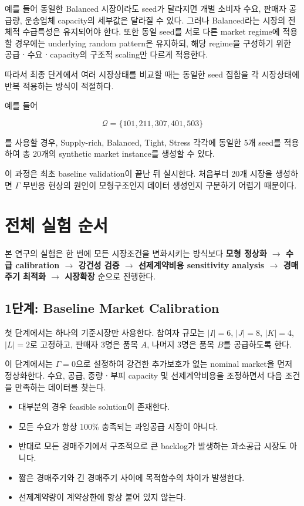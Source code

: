 \documentclass[11pt,a4paper]{article}
\begin{document}
예를 들어 동일한 Balanced 시장이라도 seed가 달라지면
개별 소비자 수요, 판매자 공급량, 운송업체 capacity의 세부값은 달라질 수 있다.
그러나 Balanced라는 시장의 전체적 수급특성은 유지되어야 한다.
또한 동일 seed를 서로 다른 market regime에 적용할 경우에는 underlying random pattern은 유지하되,
해당 regime을 구성하기 위한 공급ㆍ수요ㆍcapacity의 구조적 scaling만 다르게 적용한다.

따라서 최종 단계에서 여러 시장상태를 비교할 때는
동일한 seed 집합을 각 시장상태에 반복 적용하는 방식이 적절하다.

예를 들어

\[
\mathcal Q=\{101,211,307,401,503\}
\]

를 사용할 경우,
Supply-rich, Balanced, Tight, Stress 각각에 동일한 5개 seed를 적용하여
총 20개의 synthetic market instance를 생성할 수 있다.

이 과정은 최초 baseline validation이 끝난 뒤 실시한다.
처음부터 20개 시장을 생성하면 $\Gamma$ 무반응 현상의 원인이
모형구조인지 데이터 생성인지 구분하기 어렵기 때문이다.

\section{전체 실험 순서}

본 연구의 실험은 한 번에 모든 시장조건을 변화시키는 방식보다
\textbf{모형 정상화 $\rightarrow$ 수급 calibration $\rightarrow$ 강건성 검증 $\rightarrow$
선제계약비용 sensitivity analysis $\rightarrow$ 경매주기 최적화 $\rightarrow$ 시장확장}
순으로 진행한다.

\subsection{1단계: Baseline Market Calibration}

첫 단계에서는 하나의 기준시장만 사용한다.
참여자 규모는 $|I|=6$, $|J|=8$, $|K|=4$, $|L|=2$로 고정하고,
판매자 3명은 품목 $A$, 나머지 3명은 품목 $B$를 공급하도록 한다.

이 단계에서는 $\Gamma=0$으로 설정하여
강건한 추가보호가 없는 nominal market을 먼저 정상화한다.
수요, 공급, 중량ㆍ부피 capacity 및 선제계약비용을 조정하면서
다음 조건을 만족하는 데이터를 찾는다.

\begin{itemize}
    \item 대부분의 경우 feasible solution이 존재한다.
    \item 모든 수요가 항상 100\% 충족되는 과잉공급 시장이 아니다.
    \item 반대로 모든 경매주기에서 구조적으로 큰 backlog가 발생하는 과소공급 시장도 아니다.
    \item 짧은 경매주기와 긴 경매주기 사이에 목적함수의 차이가 발생한다.
    \item 선제계약량이 계약상한에 항상 붙어 있지 않는다.
\end{itemize}
\end{document}
